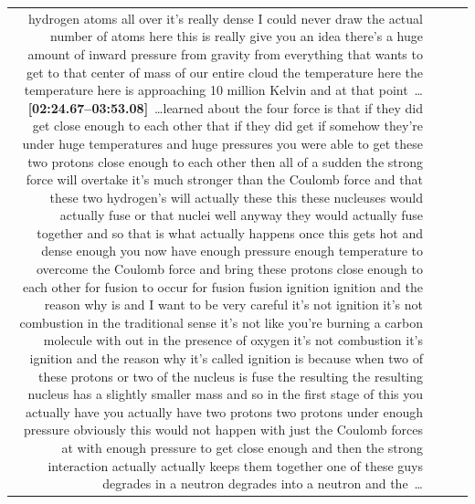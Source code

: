 \documentclass[10pt]{article}
\begin{document}
\begin{tiny}
\begin{longtable}{r p{0.3in} p{1.212in} p{3.8in}}
hydrogen atoms all over it's really dense I could never draw the actual number of atoms here this is really give you an idea there's a huge amount of inward pressure from gravity from everything that wants to get to that center of mass of our entire cloud the temperature here the temperature here is approaching 10 million Kelvin and at that point~\ldots\smallskip\newline\textbf{[02:24.67--03:53.08]}~\ldots learned about the four force is that if they did get close enough to each other that if they did get if somehow they're under huge temperatures and huge pressures you were able to get these two protons close enough to each other then all of a sudden the strong force will overtake it's much stronger than the Coulomb force and that these two hydrogen's will actually these this these nucleuses would actually fuse or that nuclei well anyway they would actually fuse together and so that is what actually happens once this gets hot and dense enough you now have enough pressure enough temperature to overcome the Coulomb force and bring these protons close enough to each other for fusion to occur for fusion fusion ignition ignition and the reason why is and I want to be very careful it's not ignition it's not combustion in the traditional sense it's not like you're burning a carbon molecule with out in the presence of oxygen it's not combustion it's ignition and the reason why it's called ignition is because when two of these protons or two of the nucleus is fuse the resulting the resulting nucleus has a slightly smaller mass and so in the first stage of this you actually have you actually have two protons two protons under enough pressure obviously this would not happen with just the Coulomb forces at with enough pressure to get close enough and then the strong interaction actually actually keeps them together one of these guys degrades in a neutron degrades into a neutron and the~\ldots \\

\end{longtable}
\end{tiny}
\end{document}
